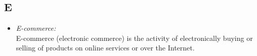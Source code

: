 \subsection*{E}
\begin{itemize}
    \item \textit{E-commerce:} \\ E-commerce (electronic commerce) is the activity of electronically buying or selling of products on online services or over the Internet.
\end{itemize}

